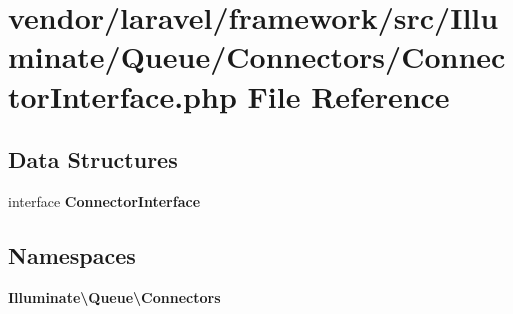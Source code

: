 \section{vendor/laravel/framework/src/\+Illuminate/\+Queue/\+Connectors/\+Connector\+Interface.php File Reference}
\label{_queue_2_connectors_2_connector_interface_8php}
\subsection*{Data Structures}
\begin{DoxyCompactItemize}
\item 
interface {\bf Connector\+Interface}
\end{DoxyCompactItemize}
\subsection*{Namespaces}
\begin{DoxyCompactItemize}
\item 
 {\bf Illuminate\textbackslash{}\+Queue\textbackslash{}\+Connectors}
\end{DoxyCompactItemize}
